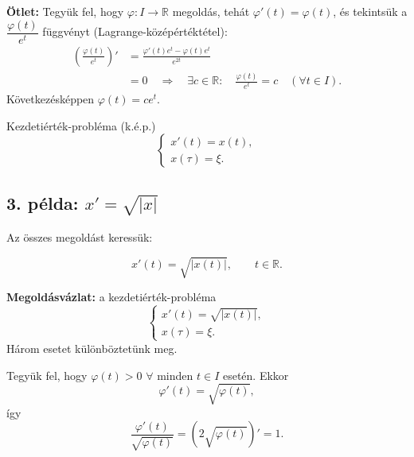 \textbf{Ötlet:} Tegyük fel, hogy $\varphi\colon I\to\mathbb R$
megoldás, tehát $\varphi'(t)=\varphi(t)$, és tekintsük a
$\dfrac{\varphi(t)}{e^t}$ függvényt (Lagrange-középértéktétel):
\begin{align*}
\left(\frac{\varphi(t)}{e^t}\right)'
 &=\frac{\varphi'(t)e^t-\varphi(t)e^t}{e^{2t}}\\
 &=0
 \quad\Longrightarrow\quad
 \exists c\in\mathbb R:\quad
 \frac{\varphi(t)}{e^t}=c
 \quad(\forall t\in I).
\end{align*}
Következésképpen $\varphi(t)=ce^t$.

\newpage
{}
\begin{center}

Kezdetiérték-probléma (k.é.p.)
\[
\boxed{\begin{cases}
 x'(t)=x(t),\\
 x(\tau)=\xi.
\end{cases}}
\]
\end{center}

\subsection*{3. példa: $x'=\sqrt{|x|}$}

Az összes megoldást keressük:
\begin{matbox}
\[
\boxed{x'(t)=\sqrt{\lvert x(t)\rvert}},\qquad t\in\mathbb R.
\]
\end{matbox}

\textbf{Megoldásvázlat:} a kezdetiérték-probléma
\[
\begin{cases}
 x'(t)=\sqrt{|x(t)|},\\
 x(\tau)=\xi.
\end{cases}
\]
Három esetet különböztetünk meg.

Tegyük fel, hogy $\varphi(t)>0$ $\forall$ minden $t\in I$ esetén. Ekkor
\[
\varphi'(t)=\sqrt{\varphi(t)},
\]
így
\[
\frac{\varphi'(t)}{\sqrt{\varphi(t)}}
 =\left(2\sqrt{\varphi(t)}\right)'=1.
\]

